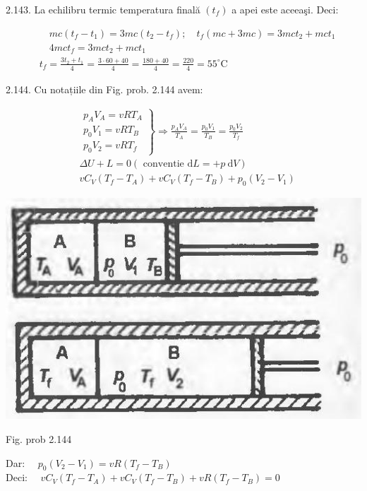 \documentclass[10pt]{article}
\begin{document}
2.143. La echilibru termic temperatura finală $\left(t_{f}\right)$ a apei este aceeaşi. Deci:

$$
\begin{aligned}
& \quad m c\left(t_{f}-t_{1}\right)=3 m c\left(t_{2}-t_{f}\right) ; \quad t_{f}(m c+3 m c)=3 m c t_{2}+m c t_{1} \\
& \quad 4 m c t_{f}=3 m c t_{2}+m c t_{1} \\
& t_{f}=\frac{3 t_{2}+t_{1}}{4}=\frac{3 \cdot 60+40}{4}=\frac{180+40}{4}=\frac{220}{4}=55^{\circ} \mathrm{C}
\end{aligned}
$$

2.144. Cu notațiile din Fig. prob. 2.144 avem:

$$
\begin{aligned}
& \left.\begin{array}{l}
p_{A} V_{A}=v R T_{A} \\
p_{0} V_{1}=v R T_{B} \\
p_{0} V_{2}=v R T_{f}
\end{array}\right\} \Rightarrow \frac{p_{A} V_{A}}{T_{A}}=\frac{p_{0} V_{1}}{T_{B}}=\frac{p_{0} V_{2}}{T_{f}} \\
& \Delta U+L=0(\text { conventie } \mathrm{d} L=+p \mathrm{~d} V) \\
& v C_{V}\left(T_{f}-T_{A}\right)+v C_{V}\left(T_{f}-T_{B}\right)+p_{0}\left(V_{2}-V_{1}\right)
\end{aligned}
$$

\begin{center}
\includegraphics[max width=\textwidth]{2025_07_01_5b3ff9fa0d508c8e9f17g-299}
\end{center}

Fig. prob 2.144

Dar: $\quad p_{0}\left(V_{2}-V_{1}\right)=v R\left(T_{f}-T_{B}\right)$\\
Deci: $\quad v C_{V}\left(T_{f}-T_{A}\right)+v C_{V}\left(T_{f}-T_{B}\right)+v R\left(T_{f}-T_{B}\right)=0$
\end{document}
